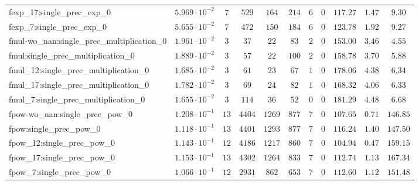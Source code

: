 \begin{tabular}{|l|c|c|c|c|c|c|c|c|c|c|}
fexp\_17:single\_prec\_exp\_0                  & $ 5.969 \cdot 10^{-2} $ & $ 7      $ & $ 529    $ & $ 164   $ & $ 214   $ & $ 6   $ & $ 0 $ & $ 117.27      $ & $ 1.47    $ & $ 9.30    $ \\
fexp\_7:single\_prec\_exp\_0                   & $ 5.655 \cdot 10^{-2} $ & $ 7      $ & $ 472    $ & $ 150   $ & $ 184   $ & $ 6   $ & $ 0 $ & $ 123.78      $ & $ 1.92    $ & $ 9.27    $ \\
fmul-wo\_nan:single\_prec\_multiplication\_0   & $ 1.961 \cdot 10^{-2} $ & $ 3      $ & $ 37     $ & $ 22    $ & $ 83    $ & $ 2   $ & $ 0 $ & $ 153.00      $ & $ 3.46    $ & $ 4.55    $ \\
fmul:single\_prec\_multiplication\_0           & $ 1.889 \cdot 10^{-2} $ & $ 3      $ & $ 57     $ & $ 22    $ & $ 100   $ & $ 2   $ & $ 0 $ & $ 158.78      $ & $ 3.70    $ & $ 5.88    $ \\
fmul\_12:single\_prec\_multiplication\_0       & $ 1.685 \cdot 10^{-2} $ & $ 3      $ & $ 61     $ & $ 23    $ & $ 67    $ & $ 1   $ & $ 0 $ & $ 178.06      $ & $ 4.38    $ & $ 6.34    $ \\
fmul\_17:single\_prec\_multiplication\_0       & $ 1.782 \cdot 10^{-2} $ & $ 3      $ & $ 69     $ & $ 24    $ & $ 82    $ & $ 1   $ & $ 0 $ & $ 168.32      $ & $ 4.06    $ & $ 6.33    $ \\
fmul\_7:single\_prec\_multiplication\_0        & $ 1.655 \cdot 10^{-2} $ & $ 3      $ & $ 114    $ & $ 36    $ & $ 52    $ & $ 0   $ & $ 0 $ & $ 181.29      $ & $ 4.48    $ & $ 6.68    $ \\
fpow-wo\_nan:single\_prec\_pow\_0              & $ 1.208 \cdot 10^{-1} $ & $ 13     $ & $ 4404   $ & $ 1269  $ & $ 877   $ & $ 7   $ & $ 0 $ & $ 107.65      $ & $ 0.71    $ & $ 146.85  $ \\
fpow:single\_prec\_pow\_0                      & $ 1.118 \cdot 10^{-1} $ & $ 13     $ & $ 4401   $ & $ 1293  $ & $ 877   $ & $ 7   $ & $ 0 $ & $ 116.24      $ & $ 1.40    $ & $ 147.50  $ \\
fpow\_12:single\_prec\_pow\_0                  & $ 1.143 \cdot 10^{-1} $ & $ 12     $ & $ 4186   $ & $ 1217  $ & $ 860   $ & $ 7   $ & $ 0 $ & $ 104.94      $ & $ 0.47    $ & $ 159.15  $ \\
fpow\_17:single\_prec\_pow\_0                  & $ 1.153 \cdot 10^{-1} $ & $ 13     $ & $ 4302   $ & $ 1264  $ & $ 833   $ & $ 7   $ & $ 0 $ & $ 112.74      $ & $ 1.13    $ & $ 167.34  $ \\
fpow\_7:single\_prec\_pow\_0                   & $ 1.066 \cdot 10^{-1} $ & $ 12     $ & $ 2931   $ & $ 862   $ & $ 653   $ & $ 7   $ & $ 0 $ & $ 112.60      $ & $ 1.12    $ & $ 151.48  $ \\

\end{tabular}
